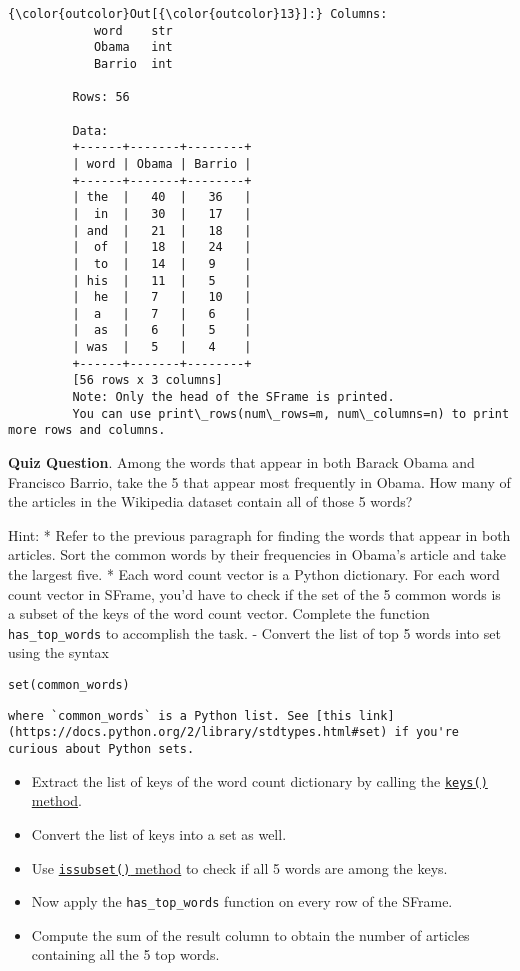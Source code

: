 \documentclass[11pt]{article}
\providecommand{\tightlist}{%
      \setlength{\itemsep}{0pt}\setlength{\parskip}{0pt}}
\begin{document}
\begin{Verbatim}[commandchars=\\\{\}]
{\color{outcolor}Out[{\color{outcolor}13}]:} Columns:
         	word	str
         	Obama	int
         	Barrio	int
         
         Rows: 56
         
         Data:
         +------+-------+--------+
         | word | Obama | Barrio |
         +------+-------+--------+
         | the  |   40  |   36   |
         |  in  |   30  |   17   |
         | and  |   21  |   18   |
         |  of  |   18  |   24   |
         |  to  |   14  |   9    |
         | his  |   11  |   5    |
         |  he  |   7   |   10   |
         |  a   |   7   |   6    |
         |  as  |   6   |   5    |
         | was  |   5   |   4    |
         +------+-------+--------+
         [56 rows x 3 columns]
         Note: Only the head of the SFrame is printed.
         You can use print\_rows(num\_rows=m, num\_columns=n) to print more rows and columns.
\end{Verbatim}
            
    \textbf{Quiz Question}. Among the words that appear in both Barack Obama
and Francisco Barrio, take the 5 that appear most frequently in Obama.
How many of the articles in the Wikipedia dataset contain all of those 5
words?

Hint: * Refer to the previous paragraph for finding the words that
appear in both articles. Sort the common words by their frequencies in
Obama's article and take the largest five. * Each word count vector is a
Python dictionary. For each word count vector in SFrame, you'd have to
check if the set of the 5 common words is a subset of the keys of the
word count vector. Complete the function \texttt{has\_top\_words} to
accomplish the task. - Convert the list of top 5 words into set using
the syntax

\begin{verbatim}
set(common_words)
\end{verbatim}

\begin{verbatim}
where `common_words` is a Python list. See [this link](https://docs.python.org/2/library/stdtypes.html#set) if you're curious about Python sets.
\end{verbatim}

\begin{itemize}
\tightlist
\item
  Extract the list of keys of the word count dictionary by calling the
  \href{https://docs.python.org/2/library/stdtypes.html\#dict.keys}{\texttt{keys()}
  method}.
\item
  Convert the list of keys into a set as well.
\item
  Use
  \href{https://docs.python.org/2/library/stdtypes.html\#set}{\texttt{issubset()}
  method} to check if all 5 words are among the keys.
\item
  Now apply the \texttt{has\_top\_words} function on every row of the
  SFrame.
\item
  Compute the sum of the result column to obtain the number of articles
  containing all the 5 top words.
\end{itemize}
\end{document}
